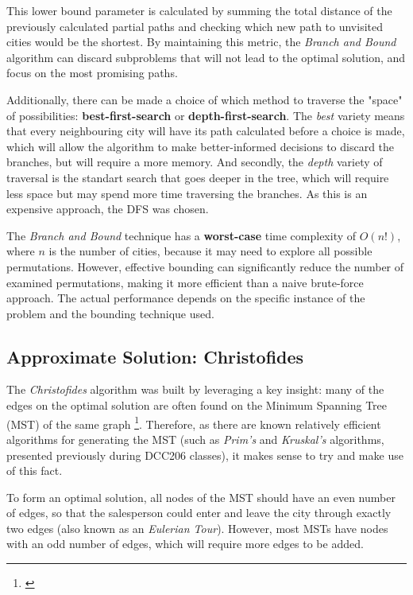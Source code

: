 \documentclass[12pt]{article}
\begin{document}
This lower bound parameter is calculated by summing the total distance of the previously calculated partial paths and checking which new path to unvisited cities would be the shortest. By maintaining this metric, the \textit{Branch and Bound} algorithm can discard subproblems that will not lead to the optimal solution, and focus on the most promising paths.

Additionally, there can be made a choice of which method to traverse the "space" of 
possibilities: \textbf{best-first-search} or \textbf{depth-first-search}. The \textit{best} 
variety means that every neighbouring city will have its path calculated before a choice is 
made, which will allow the algorithm to make better-informed decisions to discard the branches, 
but will require a more memory. And secondly, the \textit{depth} variety of traversal is the 
standart search that goes deeper in the tree, which will require less space but may spend more 
time traversing the branches. As this is an expensive approach, the DFS was chosen.

The \textit{Branch and Bound} technique has a \textbf{worst-case} time complexity of $O(n!)$, 
where $n$ is the number of cities, because it may need to explore all possible permutations. 
However, effective bounding can significantly reduce the number of examined permutations, 
making it more efficient than a naive brute-force approach. The actual performance depends on 
the specific instance of the problem and the bounding technique used.

\subsection{Approximate Solution: Christofides} \label{sec:chris_explanation}

The \textit{Christofides} algorithm was built by leveraging a key insight: many of the edges on the 
optimal solution are often found on the Minimum Spanning Tree (MST) of the same graph 
\footnote{\cite{reducible_explanation}}. Therefore, as there are known relatively efficient 
algorithms for generating the MST (such as \textit{Prim's} and \textit{Kruskal's} algorithms, presented previously during DCC206 classes), it makes sense to try and make use of this fact.

To form an optimal solution, all nodes of the MST should have an even number of edges, so 
that the salesperson could enter and leave the city through exactly two edges (also known as an 
\textit{Eulerian Tour}). However, most MSTs have nodes with an odd number of edges, 
which will require more edges to be added.
\end{document}
